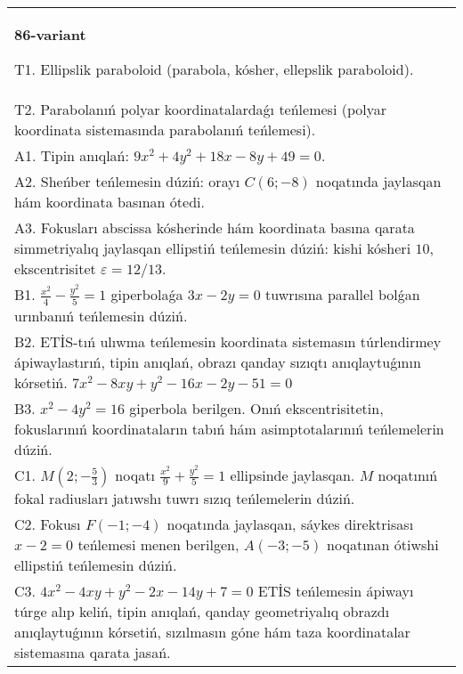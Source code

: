 \documentclass{article}
\begin{document}
\begin{tabular}{m{17cm}}
\textbf{86-variant}
\newline

T1. Ellipslik paraboloid (parabola, kósher, ellepslik paraboloid).\\

T2. Parabolanıń polyar koordinatalardaǵı teńlemesi (polyar koordinata sistemasında parabolanıń teńlemesi).\\

A1. Tipin anıqlań: $9 x^{2}+4 y^{2}+18 x-8 y+49=0$.\\

A2. Sheńber teńlemesin dúziń: orayı $C (6 ;-8) $ noqatında jaylasqan hám koordinata basınan ótedi.\\

A3. Fokusları abscissa kósherinde hám koordinata basına qarata simmetriyalıq jaylasqan ellipstiń teńlemesin dúziń: kishi kósheri $10$, ekscentrisitet $\varepsilon=12/13$.\\

B1. $\frac{x^{2}}{4} - \frac{y^{2}}{5} = 1$ giperbolaǵa $3x - 2y = 0$ tuwrısına parallel bolǵan urınbanıń teńlemesin dúziń.  \\

B2. ETİS-tıń ulıwma teńlemesin koordinata sistemasın túrlendirmey ápiwaylastırıń, tipin anıqlań, obrazı qanday sızıqtı anıqlaytuǵının kórsetiń. $7x^{2} - 8xy + y^{2} - 16x - 2y - 51 = 0$  \\

B3. $x^{2} - 4y^{2} = 16$ giperbola berilgen. Onıń ekscentrisitetin, fokuslarınıń koordinataların tabıń hám asimptotalarınıń teńlemelerin dúziń.\\

C1. $M(2; - \frac{5}{3})$ noqatı $\frac{x^{2}}{9} + \frac{y^{2}}{5} = 1$ ellipsinde jaylasqan. $M$ noqatınıń fokal radiusları jatıwshı tuwrı sızıq teńlemelerin dúziń.  \\

C2. Fokusı $F( - 1; - 4)$ noqatında jaylasqan, sáykes direktrisası $x - 2 = 0$ teńlemesi menen berilgen, $A( - 3; - 5)$ noqatınan ótiwshi ellipstiń teńlemesin dúziń.  \\

C3. $4x^{2} - 4xy + y^{2} - 2x - 14y + 7 = 0$ ETİS teńlemesin ápiwayı túrge alıp keliń, tipin anıqlań, qanday geometriyalıq obrazdı anıqlaytuǵının kórsetiń, sızılmasın góne hám taza koordinatalar sistemasına qarata jasań.  \\

\end{tabular}
\vspace{1cm}
\end{document}
